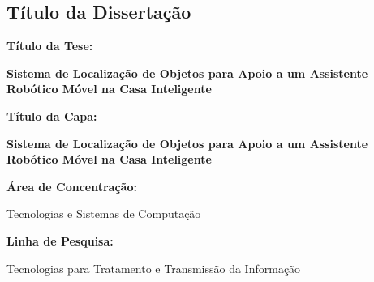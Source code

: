 \newpage
\begin{large}
\chapter*{Título da Dissertação}

\textbf{Título da Tese:}
\bigskip

\textbf{Sistema de Localização de Objetos para Apoio a um Assistente Robótico Móvel na Casa Inteligente}

\bigskip
\noindent\textbf{Título da Capa:}
\bigskip

\textbf{Sistema de Localização de Objetos para Apoio a um Assistente Robótico Móvel na Casa Inteligente}

\bigskip
\noindent\textbf{Área de Concentração:}
\bigskip

Tecnologias e Sistemas de Computação

\bigskip
\noindent\textbf{Linha de Pesquisa:}
\bigskip

Tecnologias para Tratamento e Transmissão da Informação
\end{large}

\tableofcontents